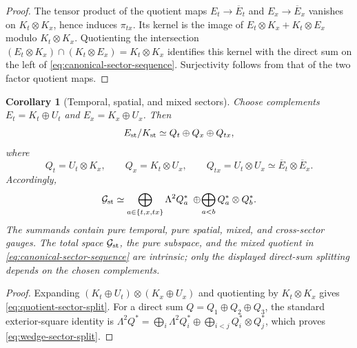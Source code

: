 \documentclass[11pt,a4paper]{article}
\newtheorem{corollary}[theorem]{Corollary}
\begin{document}
\begin{proof}
The tensor product of the quotient maps
\(E_t\to\overline E_t\) and \(E_x\to\overline E_x\) vanishes on
\(K_t\otimes K_x\), hence induces \(\pi_{tx}\).  Its kernel is the image
of \(E_t\otimes K_x+K_t\otimes E_x\) modulo
\(K_t\otimes K_x\).  Quotienting the intersection
\((E_t\otimes K_x)\cap(K_t\otimes E_x)=K_t\otimes K_x\)
identifies this kernel with the direct sum on the left of
\cref{eq:canonical-sector-sequence}.  Surjectivity follows from that of
the two factor quotient maps.
\end{proof}

\begin{corollary}[Temporal, spatial, and mixed sectors]
\label{cor:gauge-sectors}
Choose complements \(E_t=K_t\oplus U_t\) and
\(E_x=K_x\oplus U_x\).  Then
\begin{equation}\label{eq:quotient-sector-split}
 E_{\rm st}/K_{\rm st}
 \simeq Q_t\oplus Q_x\oplus Q_{tx},
\end{equation}
where
\[
 Q_t=U_t\otimes K_x,
 \qquad Q_x=K_t\otimes U_x,
 \qquad Q_{tx}=U_t\otimes U_x
 \simeq\overline E_t\otimes\overline E_x.
\]
Accordingly,
\begin{equation}\label{eq:wedge-sector-split}
 \mathcal G_{\rm st}
 \simeq
 \bigoplus_{a\in\{t,x,tx\}}\Lambda^2Q_a^*
 \;\oplus\!
 \bigoplus_{a<b}Q_a^*\otimes Q_b^*.
\end{equation}
The summands contain pure temporal, pure spatial, mixed, and cross-sector
gauges.  The total space \(\mathcal G_{\rm st}\), the pure subspace, and
the mixed quotient in \cref{eq:canonical-sector-sequence} are intrinsic;
only the displayed direct-sum splitting depends on the chosen complements.
\end{corollary}

\begin{proof}
Expanding
\((K_t\oplus U_t)\otimes(K_x\oplus U_x)\) and quotienting by
\(K_t\otimes K_x\) gives \cref{eq:quotient-sector-split}.  For a direct
sum \(Q=Q_1\oplus Q_2\oplus Q_3\), the standard exterior-square identity
is
\(
 \Lambda^2Q^*=\bigoplus_i\Lambda^2Q_i^*
 \oplus\bigoplus_{i<j}Q_i^*\otimes Q_j^*
\), which proves \cref{eq:wedge-sector-split}.
\end{proof}
\end{document}
